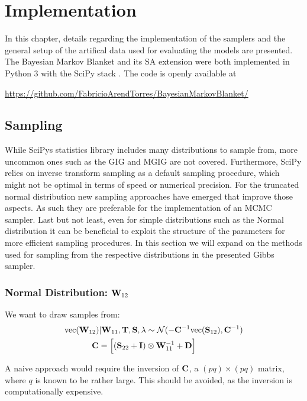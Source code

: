 \chapter{Implementation}
In this chapter, details regarding the implementation of the samplers and the general setup of the artifical data used for evaluating the models are presented.
The Bayesian Markov Blanket and its SA extension were both implemented in Python 3 with the SciPy stack \citep{scipy}.
The code is openly available at
\begin{center}
	\href{https://github.com/FabricioArendTorres/BayesianMarkovBlanket/}{https://github.com/FabricioArendTorres/BayesianMarkovBlanket/}
\end{center}

\section{Sampling}
While SciPys statistics library includes many distributions to sample from,
more uncommon ones such as the GIG and MGIG are not covered.
Furthermore, SciPy relies on inverse transform sampling as a default sampling procedure,
which might not be optimal in terms of speed or numerical precision.
For the truncated normal distribution new sampling approaches have emerged that improve those aspects. 
As such they are preferable for the implementation of an MCMC sampler.
Last but not least, even for simple distributions such as the Normal distribution it can be beneficial to exploit the structure of the parameters for more efficient sampling procedures.
In this section we will expand on the methods used for sampling from the respective distributions in the presented Gibbs sampler.

\subsection{Normal Distribution: $\mathbf{W}_{12}$}
\label{W12_draw}
We want to draw samples from:
\begin{align*}
	\text{vec}(\mathbf{W}_{12}) | \mathbf{W}_{11}, \mathbf{T}, \mathbf{S}, \lambda & \sim \mathcal{N}(-\mathbf{C}^{-1} \text{vec}(\mathbf{S}_{12}), \mathbf{C}^{-1}) 
	\\
	\mathbf{C} = \Big[
	(\mathbf{S}_{22} + \mathbf{I})                                             & \otimes \mathbf{W}_{11}^{-1} +\mathbf{D}\Big]                                 
\end{align*}

A naive approach would require the inversion of $\mathbf{C}$, a $(pq)\times(pq)$ matrix, where $q$ is known to be rather large.
This should be avoided, as the inversion is computationally expensive.

